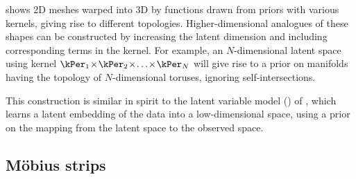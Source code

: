  shows 2D meshes warped into 3D by functions drawn from \gp{} priors with various kernels, giving rise to different topologies.
%
Higher-dimensional analogues of these shapes can be constructed by increasing the latent dimension and including corresponding terms in the kernel.
For example, an $N$-dimensional latent space using kernel $\kPer_1 \kerntimes \kPer_2 \kerntimes \ldots \kerntimes \kPer_N$ will give rise to a prior on manifolds having the topology of $N$-dimensional toruses, ignoring self-intersections.

This construction is similar in spirit to the \gp{} latent variable model (\gplvm{}) of \citet{lawrence2005probabilistic}, which learns a latent embedding of the data into a low-dimensional space, using a \gp{} prior on the mapping from the latent space to the observed space.



\subsection{M\"{o}bius strips}


